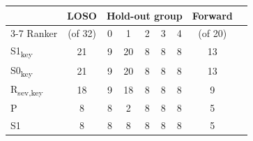 \begin{tabular}{lcccccccc}
\toprule
 & LOSO & \multicolumn{5}{c}{Hold-out group} & Forward \\
\cmidrule(lr){3-7}
Ranker & (of 32) & 0 & 1 & 2 & 3 & 4 & (of 20) \\
\midrule
S1\textsubscript{key} & 21 & 9 & 20 & 8 & 8 & 8 & 13 \\
S0\textsubscript{key} & 21 & 9 & 20 & 8 & 8 & 8 & 13 \\
R\textsubscript{sev,key} & 18 & 9 & 18 & 8 & 8 & 8 & 9 \\
P & 8 & 8 & 2 & 8 & 8 & 8 & 5 \\
S1 & 8 & 8 & 8 & 8 & 8 & 8 & 5 \\
\bottomrule
\end{tabular}

